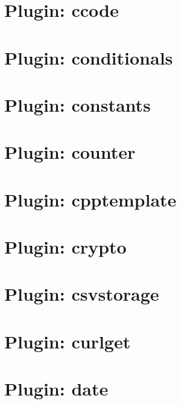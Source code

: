 \let\mypdfximage\pdfximage\def\pdfximage{\immediate\mypdfximage}\documentclass[twoside]{book}
\newcommand{\+}{\discretionary{\mbox{\scriptsize$\hookleftarrow$}}{}{}}
\begin{document}
\chapter{Plugin\+: ccode}
\label{md_src_plugins_ccode_README}

\chapter{Plugin\+: conditionals}
\label{md_src_plugins_conditionals_README}

\chapter{Plugin\+: constants}
\label{md_src_plugins_constants_README}

\chapter{Plugin\+: counter}
\label{md_src_plugins_counter_README}

\chapter{Plugin\+: cpptemplate}
\label{md_src_plugins_cpptemplate_README}

\chapter{Plugin\+: crypto}
\label{md_src_plugins_crypto_README}

\chapter{Plugin\+: csvstorage}
\label{md_src_plugins_csvstorage_README}

\chapter{Plugin\+: curlget}
\label{md_src_plugins_curlget_README}

\chapter{Plugin\+: date}
\label{md_src_plugins_date_README}

\end{document}
